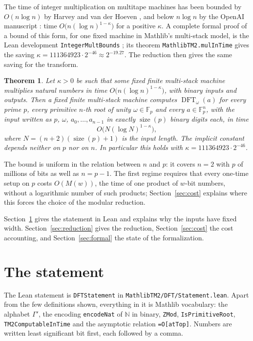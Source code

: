 \documentclass[11pt]{amsart}
\newtheorem*{theoremA}{Theorem}
\newcommand{\F}{\mathbb{F}}
\newcommand{\N}{\mathbb{N}}
\newcommand{\size}{\operatorname{size}}
\newcommand{\DFT}{\operatorname{DFT}}
\begin{document}
The time of integer multiplication on multitape machines has been bounded by
$O(n \log n)$ by Harvey and van der Hoeven \cite{HvdH}, and below $n \log n$ by the
OpenAI manuscript \cite{OAI}: time $O\bigl(n (\log n)^{1-\kappa}\bigr)$ for a positive
$\kappa$. A complete formal proof of a bound of this form, for one fixed machine in Mathlib's
multi-stack model, is the Lean development \texttt{IntegerMultBounds} \cite{IMB}; its theorem
\texttt{MathlibTM2.mulInTime} gives the saving $\kappa = 111364923\cdot 2^{-46} \approx 2^{-19.27}$.
The reduction then gives the same saving for the transform.

\begin{theoremA}
Let $\kappa > 0$ be such that some fixed finite multi-stack machine multiplies natural numbers
in time $O\bigl(n (\log n)^{1-\kappa}\bigr)$, with binary inputs and outputs. Then a fixed
finite multi-stack machine computes $\DFT_\omega(a)$ for every prime $p$, every primitive
$n$-th root of unity $\omega \in \F_p$ and every $a \in \F_p^n$, with the input written as $p$,
$\omega$, $a_0, \dots, a_{n-1}$ in exactly $\size(p)$ binary digits each, in time
\[
  O\bigl(N (\log N)^{1-\kappa}\bigr),
\]
where $N = (n+2)(\size(p)+1)$ is the input length. The implicit constant depends neither on $p$
nor on $n$. In particular this holds with $\kappa = 111364923\cdot 2^{-46}$.
\end{theoremA}

The bound is uniform in the relation between $n$ and $p$: it covers $n = 2$ with $p$ of
millions of bits as well as $n = p - 1$. The first regime requires that every one-time setup
on $p$ costs $O(M(w))$, the time of one product of $w$-bit numbers, without a logarithmic
number of such products; Section~\ref{sec:cost} explains where this forces the choice of the
modular reduction.

Section~\ref{sec:statement} gives the statement in Lean and explains why the inputs have
fixed width. Section~\ref{sec:reduction} gives the reduction, Section~\ref{sec:cost} the
cost accounting, and Section~\ref{sec:formal} the state of the formalization.

\section{The statement}
\label{sec:statement}

The Lean statement is \texttt{DFTStatement} in \texttt{MathlibTM2/DFT/Statement.lean}. Apart from
the few definitions shown, everything in it is Mathlib vocabulary: the alphabet $\Gamma'$, the
encoding \texttt{encodeNat} of $\N$ in binary, \texttt{ZMod}, \texttt{IsPrimitiveRoot},
\texttt{TM2ComputableInTime} and the asymptotic relation \texttt{=O[atTop]}. Numbers are
written least significant bit first, each followed by a comma.
\end{document}

